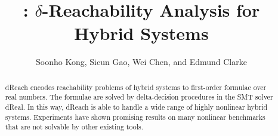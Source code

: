 \documentclass{llncs}
\title{\dReach{}: $\delta$-Reachability Analysis for Hybrid Systems}
\newcommand{\dReal}{\textsf{dReal}}
\newcommand{\dReach}{\textsf{dReach}}
\begin{document}
\mainmatter  %

\author{Soonho Kong, Sicun Gao, Wei Chen, and Edmund Clarke}
\maketitle

\begin{abstract}
  \dReach{} encodes reachability problems of hybrid systems to
  first-order formulae over real numbers. The formulae are solved by
  delta-decision procedures in the SMT solver \dReal{}. In this way,
  \dReach{} is able to handle a wide range of highly nonlinear hybrid
  systems. Experiments have shown promising results on many nonlinear
  benchmarks that are not solvable by other existing tools.
\end{abstract}










\end{document}
